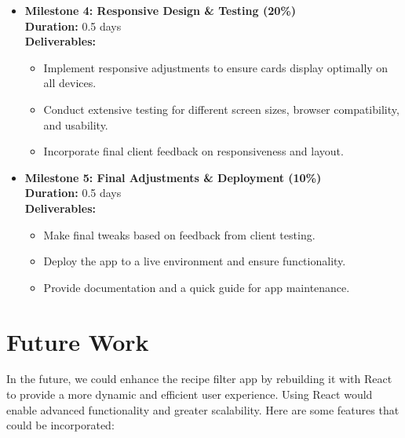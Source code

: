 \documentclass{article}
\begin{document}
\begin{itemize}
    \item \textbf{Milestone 4: Responsive Design \& Testing (20\%)} \\ 
    \textbf{Duration:} 0.5 days \\ 
    \textbf{Deliverables:}
    \begin{itemize}
        \item Implement responsive adjustments to ensure cards display optimally on all devices.
        \item Conduct extensive testing for different screen sizes, browser compatibility, and usability.
        \item Incorporate final client feedback on responsiveness and layout.
    \end{itemize}

    \item \textbf{Milestone 5: Final Adjustments \& Deployment (10\%)} \\ 
    \textbf{Duration:} 0.5 days \\ 
    \textbf{Deliverables:}
    \begin{itemize}
        \item Make final tweaks based on feedback from client testing.
        \item Deploy the app to a live environment and ensure functionality.
        \item Provide documentation and a quick guide for app maintenance.
    \end{itemize}
\end{itemize}

\section*{Future Work}

In the future, we could enhance the recipe filter app by rebuilding it with React to provide a more dynamic and efficient user experience. Using React would enable advanced functionality and greater scalability. Here are some features that could be incorporated:
\end{document}
